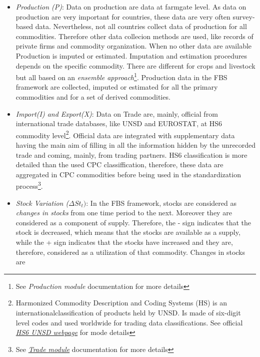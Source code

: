 \documentclass[]{article}
\let\rmarkdownfootnote\footnote%
\def\footnote{\protect\rmarkdownfootnote}
\begin{document}
\begin{itemize}
\item
  \emph{Production (P)}: Data on production are data at farmgate level.
  As data on production are very important for countries, these data are
  very often survey-based data. Nevertheless, not all countries collect
  data of production for all commodities. Therefore other data collecion
  methods are used, like records of private firms and commodity
  organization. When no other data are available Production is imputed
  or estimated. Imputation and estimation procedures depends on the
  specific commodity. There are different for crops and livestock but
  all based on an \emph{ensemble approach}\footnote{See \emph{Production
    module} documentation for more details}. Production data in the FBS
  framework are collected, imputed or estimated for all the primary
  commodities and for a set of derived commodities.
\item
  \emph{Import(I) and Export(X)}: Data on Trade are, mainly, official
  from international trade databases, like UNSD and EUROSTAT, at HS6
  commodity level\footnote{Harmonized Commodity Description and Coding
    Systems (HS) is an internationalclassification of products held by
    UNSD. Is made of six-digit level codes and used worldwide for
    trading data classifications. See official
    \href{https://unstats.un.org/unsd/tradekb/Knowledgebase/50018/Harmonized-Commodity-Description-and-Coding-Systems-HS}{\emph{HS6
    UNSD webpage}} for mode details}. Official data are integrated with
  supplementary data having the main aim of filling in all the
  information hidden by the unrecorded trade and coming, mainly, from
  trading partners. HS6 classification is more detailed than the used
  CPC classiffication, therefore, these data are aggregated in CPC
  commodities before being used in the standardization process\footnote{See
    \href{https://github.com/SWS-Methodology/faoswsTrade/blob/master/vignettes/Documentation/tradeDocumentation.pdf}{\emph{Trade
    module}} documentation for more details}.
\item
  \emph{Stock Variation (}\(\Delta St_{t})\): In the FBS framework,
  stocks are considered as \emph{changes in stocks} from one time period
  to the next. Moreover they are considered as a component of supply.
  Therefore, the - sign indicates that the stock is decreased, which
  means that the stocks are available as a supply, while the + sign
  indicates that the stocks have increased and they are, therefore,
  considered as a utilization of that commodity. Changes in stocks are

\end{itemize}
\end{document}
